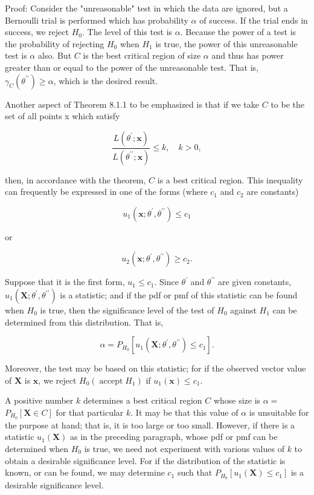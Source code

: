 Proof: Consider the "unreasonable" test in which the data are ignored, but a Bernoulli trial is performed which has probability $\alpha$ of success. If the trial ends in success, we reject $H_{0}$. The level of this test is $\alpha$. Because the power of a test is the probability of rejecting $H_{0}$ when $H_{1}$ is true, the power of this unreasonable test is $\alpha$ also. But $C$ is the best critical region of size $\alpha$ and thus has power greater than or equal to the power of the unreasonable test. That is, $\gamma_{C}\left(\theta^{\prime \prime}\right) \geq \alpha$, which is the desired result.

Another aspect of Theorem 8.1.1 to be emphasized is that if we take $C$ to be the set of all points x which satisfy

$$
\frac{L\left(\theta^{\prime} ; \mathbf{x}\right)}{L\left(\theta^{\prime \prime} ; \mathbf{x}\right)} \leq k, \quad k>0,
$$

then, in accordance with the theorem, $C$ is a best critical region. This inequality can frequently be expressed in one of the forms (where $c_{1}$ and $c_{2}$ are constants)

$$
u_{1}\left(\mathbf{x} ; \theta^{\prime}, \theta^{\prime \prime}\right) \leq c_{1}
$$

or

$$
u_{2}\left(\mathbf{x} ; \theta^{\prime}, \theta^{\prime \prime}\right) \geq c_{2} .
$$

Suppose that it is the first form, $u_{1} \leq c_{1}$. Since $\theta^{\prime}$ and $\theta^{\prime \prime}$ are given constants, $u_{1}\left(\mathbf{X} ; \theta^{\prime}, \theta^{\prime \prime}\right)$ is a statistic; and if the pdf or pmf of this statistic can be found when $H_{0}$ is true, then the significance level of the test of $H_{0}$ against $H_{1}$ can be determined from this distribution. That is,

$$
\alpha=P_{H_{0}}\left[u_{1}\left(\mathbf{X} ; \theta^{\prime}, \theta^{\prime \prime}\right) \leq c_{1}\right] .
$$

Moreover, the test may be based on this statistic; for if the observed vector value of $\mathbf{X}$ is $\mathbf{x}$, we reject $H_{0}\left(\operatorname{accept} H_{1}\right)$ if $u_{1}(\mathbf{x}) \leq c_{1}$.

A positive number $k$ determines a best critical region $C$ whose size is $\alpha=$ $P_{H_{0}}[\mathbf{X} \in C]$ for that particular $k$. It may be that this value of $\alpha$ is unsuitable for the purpose at hand; that is, it is too large or too small. However, if there is a statistic $u_{1}(\mathbf{X})$ as in the preceding paragraph, whose pdf or pmf can be determined when $H_{0}$ is true, we need not experiment with various values of $k$ to obtain a desirable significance level. For if the distribution of the statistic is known, or can be found, we may determine $c_{1}$ such that $P_{H_{0}}\left[u_{1}(\mathbf{X}) \leq c_{1}\right]$ is a desirable significance level.

